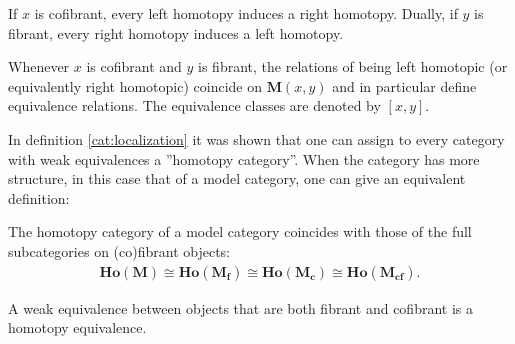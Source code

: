     \begin{property}
        If $x$ is cofibrant, every left homotopy induces a right homotopy. Dually, if $y$ is fibrant, every right homotopy induces a left homotopy.
    \end{property}
    \begin{result}
        Whenever $x$ is cofibrant and $y$ is fibrant, the relations of being left homotopic (or equivalently right homotopic) coincide on $\mathbf{M}(x, y)$ and in particular define equivalence relations. The equivalence classes are denoted by $[x, y]$.
    \end{result}

    In definition \ref{cat:localization} it was shown that one can assign to every category with weak equivalences a ''homotopy category''. When the category has more structure, in this case that of a model category, one can give an equivalent definition:
    \begin{property}
        The homotopy category of a model category coincides with those of the full subcategories on (co)fibrant objects:
        \begin{gather}
            \mathbf{Ho(M)}\cong\mathbf{Ho(M_f)}\cong\mathbf{Ho(M_c)}\cong\mathbf{Ho(M_{cf})}.
        \end{gather}
    \end{property}

    \begin{theorem}[Whitehead]
        A weak equivalence between objects that are both fibrant and cofibrant is a homotopy equivalence.
    \end{theorem}

